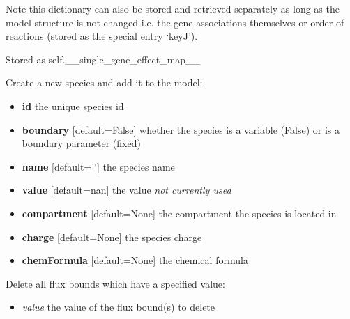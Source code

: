 \documentclass[a4paper,11pt,english]{sphinxmanual}
\begin{document}
\begin{fulllineitems}
\begin{fulllineitems}
Note this dictionary can also be stored and retrieved separately as long as the model structure is not changed i.e.
the gene associations themselves or order of reactions (stored as the special entry `keyJ').

Stored as self.\_\_single\_gene\_effect\_map\_\_

\end{fulllineitems}


\begin{fulllineitems}
\label{modules_doc:cbmpy.CBModel.Model.createSpecies}
Create a new species and add it to the model:
\begin{itemize}
\item {} 
\textbf{id} the unique species id

\item {} 
\textbf{boundary} {[}default=False{]} whether the species is a variable (False) or is a boundary parameter (fixed)

\item {} 
\textbf{name} {[}default='`{]} the species name

\item {} 
\textbf{value} {[}default=nan{]} the value \emph{not currently used}

\item {} 
\textbf{compartment} {[}default=None{]} the compartment the species is located in

\item {} 
\textbf{charge} {[}default=None{]} the species charge

\item {} 
\textbf{chemFormula} {[}default=None{]} the chemical formula

\end{itemize}

\end{fulllineitems}


\begin{fulllineitems}
\label{modules_doc:cbmpy.CBModel.Model.deleteAllFluxBoundsWithValue}
Delete all flux bounds which have a specified value:
\begin{itemize}
\item {} 
\emph{value} the value of the flux bound(s) to delete


\end{itemize}
\end{fulllineitems}
\end{fulllineitems}
\end{document}
